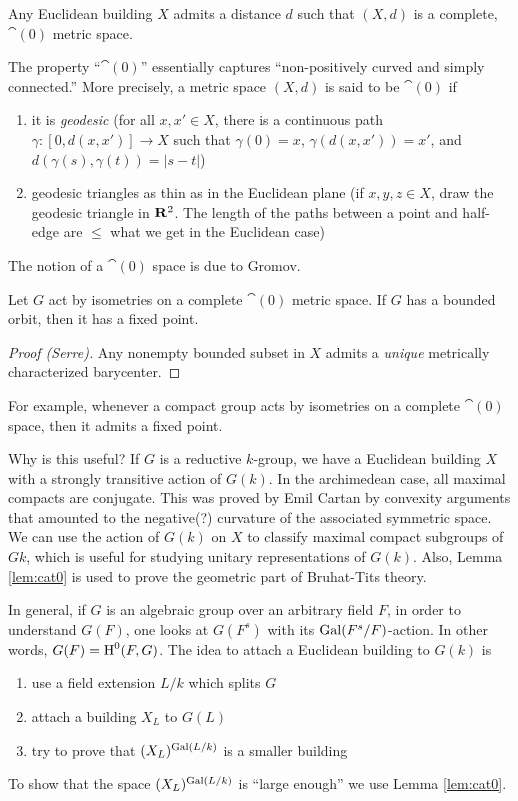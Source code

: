 \begin{theo}
Any Euclidean building $X$ admits a distance $d$ such that $(X,d)$ is a 
complete, $\cat(0)$ metric space. 
\end{theo}

The property ``$\cat(0)$'' essentially captures ``non-positively curved and 
simply connected.'' More precisely, a metric space $(X,d)$ is said to be 
$\cat(0)$ if 
\begin{enumerate}
  \item it is \emph{geodesic} (for all $x,x'\in X$, there is a continuous 
    path $\gamma:[0,d(x,x')] \to X$ such that $\gamma(0)=x$, $\gamma(d(x,x'))=x'$, 
    and $d(\gamma(s),\gamma(t)) = |s-t|$) 
  \item geodesic triangles as thin as in the Euclidean plane (if 
    $x,y,z\in X$, draw the geodesic triangle in $\mathbf{R}^2$. The length of the 
    paths between a point and half-edge are $\leqslant$ what we get in the 
    Euclidean case)
\end{enumerate}

The notion of a $\cat(0)$ space is due to Gromov. 

\begin{lemm}\label{lem:cat0}
Let $G$ act by isometries on a complete $\cat(0)$ metric space. If $G$ has a 
bounded orbit, then it has a fixed point. 
\end{lemm}
\begin{proof}[Proof (Serre)]
Any nonempty bounded subset in $X$ admits a \emph{unique} metrically characterized 
barycenter. 
\end{proof}

For example, whenever a compact group acts by isometries on a complete 
$\cat(0)$ space, then it admits a fixed point. 

Why is this useful? If $G$ is a reductive $k$-group, we have a Euclidean building 
$X$ with a strongly transitive action of $G(k)$. In the archimedean case, 
all maximal compacts are conjugate. This was proved by Emil Cartan by convexity 
arguments that amounted to the negative(?) curvature of the associated symmetric 
space. We can use the action of $G(k)$ on $X$ to classify maximal compact 
subgroups of $Gk$, which is useful for studying unitary representations of $G(k)$. 
Also, Lemma \ref{lem:cat0} is used to prove the geometric part of Bruhat-Tits 
theory. 

In general, if $G$ is an algebraic group over an arbitrary field $F$, in order 
to understand $G(F)$, one looks at $G(F^s)$ with its $\operatorname{Gal}(F^s/F)$-action. 
In other words, $G(F)=\operatorname{H}^0(F,G)$. The idea to attach a Euclidean building to 
$G(k)$ is 
\begin{enumerate}
  \item use a field extension $L/k$ which splits $G$
  \item attach a building $X_L$ to $G(L)$
  \item try to prove that $(X_L)^{\operatorname{Gal}(L/k)}$ is a smaller building
\end{enumerate}
To show that the space $(X_L)^{\operatorname{Gal}(L/k)}$ is ``large enough'' we use 
Lemma \ref{lem:cat0}. 


